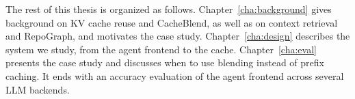 The rest of this thesis is organized as follows. Chapter~\ref{cha:background} gives background on KV cache reuse and CacheBlend, as well as on context retrieval and RepoGraph, and motivates the case study. Chapter~\ref{cha:design} describes the system we study, from the agent frontend to the cache. Chapter~\ref{cha:eval} presents the case study and discusses when to use blending instead of prefix caching. It ends with an accuracy evaluation of the agent frontend across several LLM backends.
